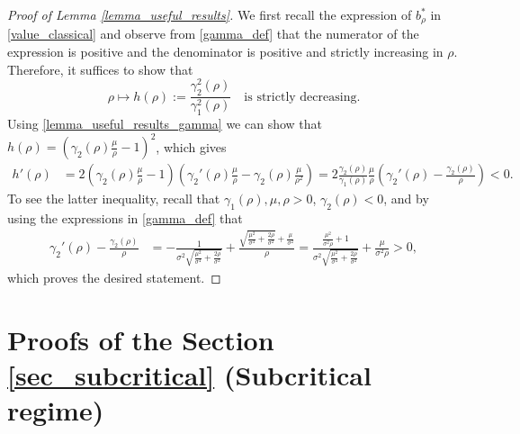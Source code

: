 \documentclass[11pt]{article} %
\numberwithin{komcounter}{section}
\numberwithin{equation}{section}
\numberwithin{theorem}{section}
\begin{document}
\begin{proof}[Proof of Lemma 
\ref{lemma_useful_results}] 
We first recall the expression of $b_\rho^*$ in \eqref{value_classical} and observe from \eqref{gamma_def} that the numerator of the expression is positive and the denominator is positive and strictly increasing in $\rho$. 
Therefore, it suffices to show that 
$$
\rho \mapsto h(\rho) := \frac{\gamma_2^2(\rho)}{\gamma_1^2(\rho)} 
\quad \text{is strictly decreasing}. 
$$
Using \eqref{lemma_useful_results_gamma} we can show that $h(\rho) = (\gamma_2(\rho)\frac{\mu}{\rho}-1 )^2$, which gives
\begin{align*}
h'(\rho)
&=2\left(\gamma_2(\rho)\frac{\mu}{\rho}-1\right)\left(\gamma_2'(\rho)\frac{\mu}{\rho}-\gamma_2(\rho)\frac{\mu}{\rho^2}\right) 
=2\frac{\gamma_2(\rho)}{\gamma_1(\rho)}\frac{\mu}{\rho}\left(\gamma_2'(\rho)-\frac{\gamma_2(\rho)}{\rho}\right) < 0.
\end{align*}
To see the latter inequality, recall that $\gamma_1(\rho), \mu, \rho > 0$, $\gamma_2(\rho) < 0$, and by using the expressions in \eqref{gamma_def} that 
\begin{align}
\gamma_2'(\rho)-\frac{\gamma_2(\rho)}{\rho} 
&=-\tfrac{1}{\sigma^2\sqrt{\frac{\mu^2}{\sigma^4}+\frac{2\rho}{\sigma^2}}} + \tfrac{\sqrt{\frac{\mu^2}{\sigma^4}+\frac{2\rho}{\sigma^2}}+\frac{\mu}{\sigma^2}}{\rho}
=\tfrac{\frac{\mu^2}{\sigma^2\rho}+1}{\sigma^2\sqrt{\frac{\mu^2}{\sigma^4}+\frac{2\rho}{\sigma^2}}}+\frac{\mu}{\sigma^2\rho}>0,
\end{align}
which proves the desired statement.
\end{proof}



\section{Proofs of the Section \ref{sec_subcritical} (Subcritical regime)}
\label{App_sec_subcritical}
\end{document}
